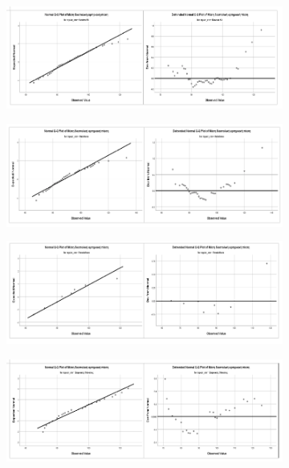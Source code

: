 \begin{figure}[h]
 \centering

     \begin{subfigure}{0.8\textwidth}
     \centering
         \includegraphics[width=\textwidth]{images/127.PNG}
                      \end{subfigure}
     
     \begin{subfigure}{0.8\textwidth}
     \centering
         \includegraphics[width=\textwidth]{images/128.PNG}
                    \end{subfigure}
                    
                    \begin{subfigure}{0.8\textwidth}
     \centering
         \includegraphics[width=\textwidth]{images/129.PNG}
                    \end{subfigure}
                    
                    \begin{subfigure}{0.8\textwidth}
     \centering
         \includegraphics[width=\textwidth]{images/130.PNG}
                    \end{subfigure}
\end{figure}

